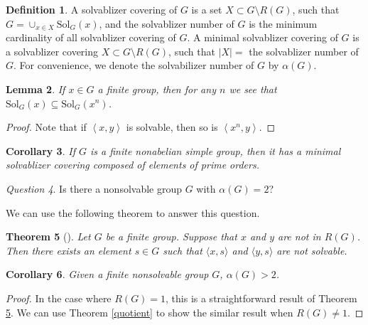 \documentclass{amsart}
\newcommand{\Solv}{\text{Sol}}
\newtheorem{theorem}{Theorem}[section]
\newtheorem{lemma}[theorem]{Lemma}
\newtheorem{corollary}[theorem]{Corollary}
\theoremstyle{definition}
\newtheorem{definition}[theorem]{Definition}
\theoremstyle{remark}
\newtheorem{question}[theorem]{Question}
\begin{document}
\begin{definition} A solvablizer covering of $G$ is a set $X\subset G \setminus R(G)$, such that $G=\cup_{x\in X}\Solv_G(x)$, and the solvablizer number of $G$ is the minimum cardinality of all solvablizer covering of $G$.
	A minimal solvablizer covering of $G$ is a solvablizer covering $X\subset G\setminus R(G)$, such that $\mid X\mid=$  the solvablizer number of $G$. For convenience, we denote the solvabilizer number of $G$ by $\alpha(G)$.
\end{definition} 
\begin{lemma} If $x\in G$ a finite group, then for any $n$ we see that $\Solv_G(x)\subseteq \Solv_G(x^n)$.\end{lemma}
\begin{proof} Note that if $\left\langle x, y\right\rangle$ is solvable, then so is $\left\langle x^n, y\right\rangle$.\end{proof}

\begin{corollary}\label{primes} If $G$ is a finite nonabelian simple group, then it has a minimal solvablizer covering composed of elements of prime orders.\end{corollary}



\begin{question}
Is there a nonsolvable group $G$ with $\alpha(G)=2$?
\end{question}
We can use the following theorem to answer this question.
\begin{theorem} [\cite{GKPS}]\label{GKPS-nonsolvable}
Let $G$ be a finite group. Suppose that $x$ and $y$ are not in $R(G)$. Then there
exists an element $s\in G$ such that $\langle x, s\rangle$ and $\langle y, s\rangle$ are not solvable.
\end{theorem}
\begin{corollary}\label{alphag2}
Given a finite nonsolvable group $G$, $\alpha(G)>2$.
\end{corollary}
\begin{proof} 
In the case where $R(G)=1$, this is a straightforward result of Theorem \ref{GKPS-nonsolvable}. We can use Theorem \ref{quotient} to show the similar result when $R(G)\neq 1$.
\end{proof}
\end{document}
